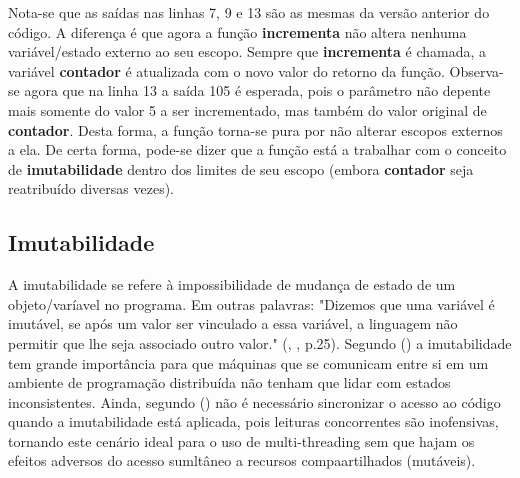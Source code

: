Nota-se que as saídas nas linhas 7, 9 e 13 são as mesmas da versão anterior do código. A diferença é que agora a função
\textbf{incrementa} não altera nenhuma variável/estado externo ao seu escopo. Sempre que \textbf{incrementa} é chamada,
a variável \textbf{contador} é atualizada com o novo valor do retorno da função. Observa-se agora que na linha 13 a saída
105 é esperada, pois o parâmetro não depente mais somente do valor 5 a ser incrementado, mas também do valor original de
\textbf{contador}.
Desta forma, a função torna-se pura por não alterar escopos externos a ela. De certa forma, pode-se dizer que a função está a trabalhar
com o conceito de \textbf{imutabilidade} dentro dos limites de seu escopo (embora \textbf{contador} seja reatribuído diversas vezes).

\subsection{Imutabilidade}
A imutabilidade se refere à impossibilidade de mudança de estado de um objeto/varíavel no programa. Em outras palavras: "Dizemos que uma variável é imutável, se após um valor ser vinculado a essa variável, a linguagem não permitir que lhe seja associado outro valor." (\citeauthor{queiroz_func_prog}, \citeyear{queiroz_func_prog}, p.25).\linebreak
Segundo \citeauthor{queiroz_func_prog} (\citeyear{queiroz_func_prog}) a imutabilidade tem grande importância para que máquinas que se comunicam entre
si em um ambiente de programação distribuída não tenham que lidar com estados inconsistentes.\linebreak
Ainda, segundo \citeauthor{goncalves_func_prog} (\citeyear{goncalves_func_prog}) não é necessário sincronizar o acesso ao código quando a imutabilidade está aplicada, pois leituras concorrentes são inofensivas, tornando este cenário ideal para o uso de multi-threading sem que hajam os efeitos adversos
do acesso sumltâneo a recursos compaartilhados (mutáveis).